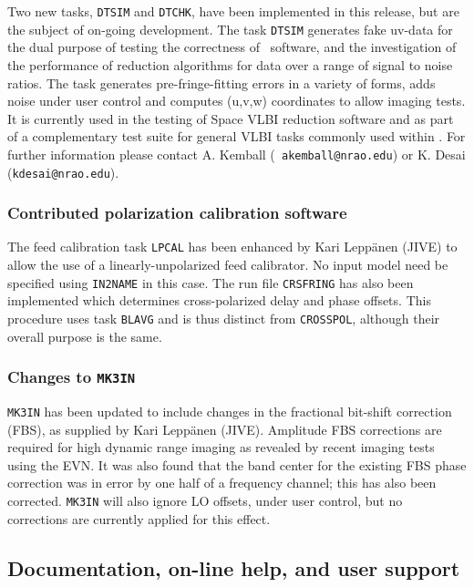 Two new tasks, {\tt DTSIM} and {\tt DTCHK}, have been implemented in
this release, but are the subject of on-going development. The task
{\tt DTSIM} generates fake uv-data for the dual purpose of testing the
correctness of \AIPS\ software, and the investigation of the
performance of reduction algorithms for data over a range of signal to
noise ratios. The task generates pre-fringe-fitting errors in a
variety of forms, adds noise under user control and computes (u,v,w)
coordinates to allow imaging tests. It is currently used in the
testing of Space VLBI reduction software and as part of a
complementary test suite for general VLBI tasks commonly used within
\AIPS. For further information please contact A. Kemball ({\tt
akemball@nrao.edu}) or K. Desai ({\tt kdesai@nrao.edu}).

\subsubsection{Contributed polarization calibration software}

The feed calibration task {\tt LPCAL} has been enhanced by Kari
Lepp\"anen (JIVE) to allow the use of a linearly-unpolarized feed
calibrator. No input model need be specified using {\tt IN2NAME} in
this case. The run file {\tt CRSFRING} has also been implemented which
determines cross-polarized delay and phase offsets. This procedure
uses task {\tt BLAVG} and is thus distinct from {\tt CROSSPOL},
although their overall purpose is the same.

\subsubsection{Changes to {\tt MK3IN}}

{\tt MK3IN} has been updated to include changes in the fractional
bit-shift correction (FBS), as supplied by Kari Lepp\"anen (JIVE).
Amplitude FBS corrections are required for high dynamic range imaging
as revealed by recent imaging tests using the EVN. It was also found
that the band center for the existing FBS phase correction was in
error by one half of a frequency channel; this has also been
corrected. {\tt MK3IN} will also ignore LO offsets, under user
control, but no corrections are currently applied for this effect.


\subsection{Documentation, on-line help, and user support}

